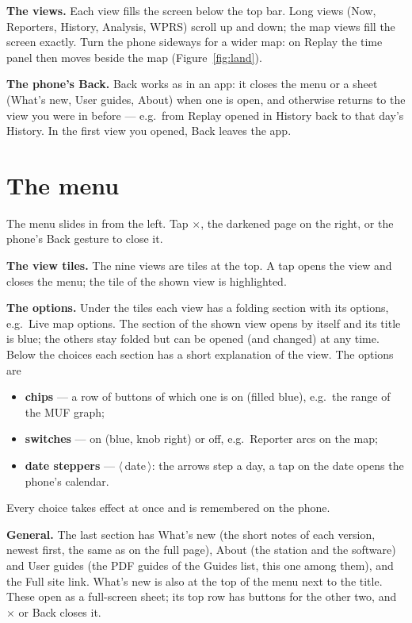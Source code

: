 \documentclass[10pt,a4paper]{article}
\newcommand{\ui}[1]{\textsf{\small #1}}            %
\newcommand{\lead}[1]{\textbf{#1}\enspace}           %
\begin{document}
\lead{The views.} Each view fills the screen below the top bar. Long views (Now, Reporters, History, Analysis, WPRS) scroll up and down; the map views fill the screen exactly. Turn the phone sideways for a wider map: on Replay the time panel then moves beside the map (Figure~\ref{fig:land}).

\lead{The phone's Back.} Back works as in an app: it closes the menu or a sheet (What's new, User guides, About) when one is open, and otherwise returns to the view you were in before --- e.g.\ from Replay opened in History back to that day's History. In the first view you opened, Back leaves the app.

\section{The menu}\label{sec:menu}
The menu slides in from the left. Tap \ui{$\times$}, the darkened page on the right, or the phone's Back gesture to close it.

\lead{The view tiles.} The nine views are tiles at the top. A tap opens the view and closes the menu; the tile of the shown view is highlighted.

\lead{The options.} Under the tiles each view has a folding section with its options, e.g.\ \ui{Live map options}. The section of the shown view opens by itself and its title is blue; the others stay folded but can be opened (and changed) at any time. Below the choices each section has a short explanation of the view. The options are
\begin{itemize}[leftmargin=1.2em]
\item \textbf{chips} --- a row of buttons of which one is on (filled blue), e.g.\ the range of the MUF graph;
\item \textbf{switches} --- on (blue, knob right) or off, e.g.\ \ui{Reporter arcs} on the map;
\item \textbf{date steppers} --- \ui{$\langle$}\,date\,\ui{$\rangle$}: the arrows step a day, a tap on the date opens the phone's calendar.
\end{itemize}
Every choice takes effect at once and is remembered on the phone.

\lead{General.} The last section has \ui{What's new} (the short notes of each version, newest first, the same as on the full page), \ui{About} (the station and the software) and \ui{User guides} (the PDF guides of the Guides list, this one among them), and the \ui{Full site} link. What's new is also at the top of the menu next to the title. These open as a full-screen sheet; its top row has buttons for the other two, and \ui{$\times$} or Back closes it.
\end{document}
